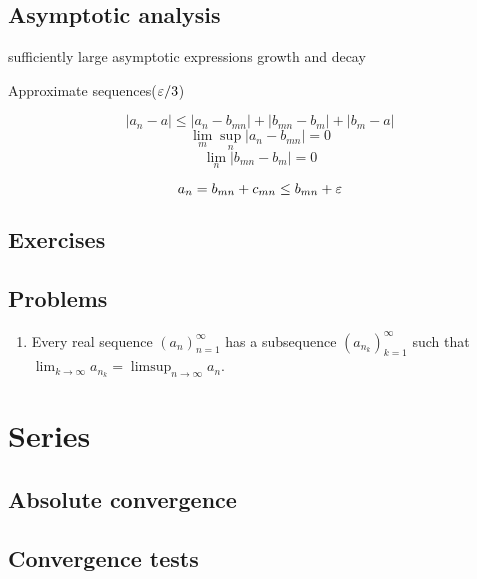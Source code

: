 \documentclass{../../large}
\begin{document}
\begin{prb}
\end{prb}


\section{Asymptotic analysis}
sufficiently large
asymptotic expressions
growth and decay

Approximate sequences($\varepsilon/3$)

\begin{prb}
\[|a_n-a|\le|a_n-b_{mn}|+|b_{mn}-b_m|+|b_m-a|\]
\[\lim_m\sup_n|a_n-b_{mn}|=0\]
\[\lim_n|b_{mn}-b_m|=0\]
\end{prb}

\[a_n=b_{mn}+c_{mn}\le b_{mn}+\varepsilon\]





\section*{Exercises}
\begin{prb}
\end{prb}
\begin{prb}
\end{prb}
\section*{Problems}
\begin{enumerate}
\item Every real sequence $(a_n)_{n=1}^\infty$ has a subsequence $(a_{n_k})_{k=1}^\infty$ such that $\lim_{k\to\infty}a_{n_k}=\limsup_{n\to\infty}a_n$.
\end{enumerate}





\chapter{Series}

\section{Absolute convergence}
\begin{prb}
\end{prb}


\section{Convergence tests}
\end{document}
